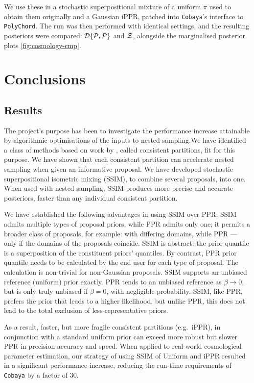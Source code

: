 \documentclass[usenatbib]{mnras}
\begin{document}
We use these in a stochastic superpositional mixture of a uniform
$\pi$ used to obtain them originally and a Gaussian iPPR, patched into
\texttt{Cobaya}'s interface to \texttt{PolyChord}. The run was then
performed with identical settings, and the resulting posteriors were
compared: ${\cal D}\{ {\cal P}, \bar{\cal P}\}$ and ${\cal Z}$,
alongside the marginalised posterior plots \cref{fig:cosmology-cmp}. 


\section{Conclusions}\label{sec:orgdf2cbd9}

\subsection{Results}\label{sec:orgc48c55d}
The project's purpose has been to investigate the performance increase
attainable by algorithmic optimisations of the inputs to nested
sampling.We have identified a class of methods based on work by
\cite{chen-ferroz-hobson}, called consistent partitions, fit for this
purpose. We have shown that each consistent partition can accelerate
nested sampling when given an informative proposal.  We have developed
stochastic superpositional isometric mixing (SSIM), to combine several
proposals, into one. When used with nested sampling, SSIM produces
more precise and accurate posteriors, faster than any individual
consistent partition.

We have established the following advantages in using SSIM over PPR:
SSIM admits multiple types of proposal priors, while PPR admits only
one; it permits a broader class of proposals, for example: with
differing domains, while PPR --- only if the domains of the proposals
coincide.  SSIM is abstract: the prior quantile is a superposition of
the constituent priors' quantiles. By contrast, PPR prior quantile
needs to be calculated by the end user for each type of proposal. The
calculation is non-trivial for non-Gaussian proposals. SSIM supports
an unbiased reference (uniform) prior exactly. PPR tends to an
unbiased reference as \(\beta\rightarrow 0 \), but is only truly
unbiased if $\beta=0$, with negligible probability. SSIM, like PPR,
prefers the prior that leads to a higher likelihood, but unlike PPR,
this does not lead to the total exclusion of less-representative
priors.


As a result, faster, but more fragile consistent partitions
(e.g.~iPPR), in conjunction with a standard uniform prior can exceed
more robust but slower PPR in precision accuracy and speed.  When
applied to real-world cosmological parameter estimation, our strategy
of using SSIM of Uniform and iPPR resulted in a significant
performance increase, reducing the run-time requirements of
\texttt{Cobaya} by a factor of 30.
\end{document}
